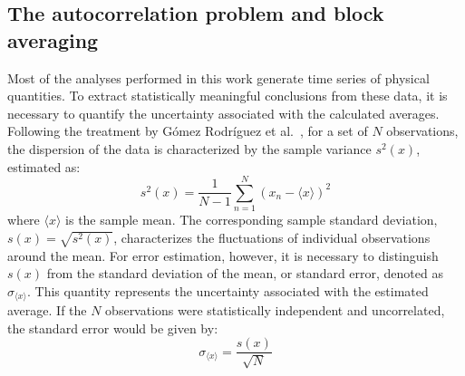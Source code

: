 \subsection{The autocorrelation problem and block averaging}
Most of the analyses performed in this work generate time series of physical quantities. To extract statistically meaningful conclusions from these data, it is necessary to quantify the uncertainty associated with the calculated averages. Following the treatment by Gómez Rodríguez et al.~\cite{tratamiento_datos_fisicos}, for a set of $N$ observations, the dispersion of the data is characterized by the sample variance $s^2(x)$, estimated as:
\begin{equation}
s^2(x) =
\frac{1}{N-1}
\sum_{n=1}^{N}
\left(x_n-\langle x\rangle\right)^2
\label{eq:variance}
\end{equation}
where $\langle x\rangle$ is the sample mean. The corresponding sample standard deviation, $s(x)=\sqrt{s^2(x)}$, characterizes the fluctuations of individual observations around the mean.
For error estimation, however, it is necessary to distinguish $s(x)$ from the standard deviation of the mean, or standard error, denoted as $\sigma_{\langle x\rangle}$. This quantity represents the uncertainty associated with the estimated average. If the $N$ observations were statistically independent and uncorrelated, the standard error would be given by:
\begin{equation}
\sigma_{\langle x\rangle}
=
\frac{s(x)}{\sqrt{N}}
\label{eq:std_error}
\end{equation}

